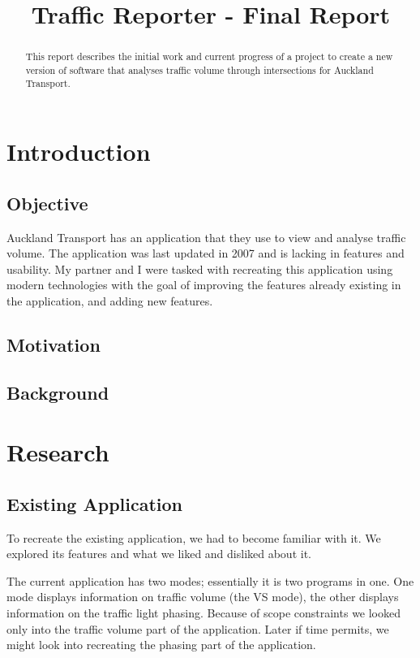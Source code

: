\documentclass{article}
\title{Traffic Reporter - Final Report}
\begin{document}


\maketitle

\begin{abstract}
This report describes the initial work and current
progress of a project to create a new version of software that
analyses traffic volume through intersections for Auckland
Transport\cite{sims1981scat}.

\end{abstract}

\section{Introduction}
\subsection{Objective}
Auckland Transport has an application that they use to view and analyse traffic volume. The application was last updated in 2007 and is lacking in features and usability. My partner and I were tasked with recreating this application using modern technologies with the goal of improving the features already existing in the application, and adding new features.

\subsection{Motivation}


\subsection{Background}

\section{Research}
\subsection{Existing Application}
To recreate the existing application, we had to become
familiar with it. We explored its features and what we liked
and disliked about it.

The current application has two modes; essentially it is two
programs in one. One mode displays information on traffic
volume (the VS mode), the other displays information on the
traffic light phasing. Because of scope constraints we looked
only into the traffic volume part of the application. Later if
time permits, we might look into recreating the phasing part of
the application.
\end{document}
